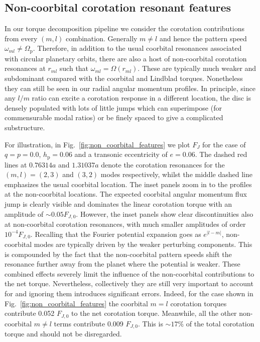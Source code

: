 \subsection{Non-coorbital corotation resonant features}
\label{subsection:non-coorbital resonances}

In our torque decomposition pipeline we consider the corotation contributions from every $(m,l)$ combination. Generally $m \neq l$ and hence the pattern speed $\omega_{ml}\neq \Omega_\textrm{p}$. Therefore, in addition to the usual coorbital resonances associated with circular planetary orbits, there are also a host of non-coorbital corotation resonances at $r_{ml}$ such that $\omega_{ml}=\Omega(r_{ml})$. These are typically much weaker and subdominant compared with the coorbital and Lindblad torques. Nonetheless they can still be seen in our radial angular momentum profiles. In principle, since any $l/m$ ratio can excite a corotation response in a different location, the disc is densely populated with lots of little jumps which can superimpose (for commensurable modal ratios) or be finely spaced to give a complicated substructure.

For illustration, in Fig.~\ref{fig:non_coorbital_features} we plot $F_{J}$ for the case of $q=p=0.0$, $h_\textrm{p}=0.06$ and a transonic eccentricity of $e=0.06$. The dashed red lines at $0.76314 a$ and $1.31037a$ denote the corotation resonances for the $(m,l) = (2,3)$ and $(3,2)$ modes respectively, whilst the middle dashed line emphasizes the usual coorbital location. The inset panels zoom in to the profiles at the non-coorbital locations. The expected coorbital angular momentum flux jump is clearly visible and dominates the linear corotation torque with an amplitude of $\sim 0.05 F_{J,0}$. However, the inset panels show clear discontinuities also at non-coorbital corotation resonances, with much smaller amplitudes of order $10^{-4} F_{J,0}$. Recalling that the Fourier potential expansion goes as $e^{|l-m|}$, non-coorbital modes are typically driven by the weaker perturbing components. This is compounded by the fact that the non-coorbital pattern speeds shift the resonance further away from the planet where the potential is weaker. These combined effects severely limit the influence of the non-coorbital contributions to the net torque. Nevertheless, collectively they are still very important to account for and ignoring them introduces significant errors. Indeed, for the case shown in Fig.~\ref{fig:non_coorbital_features} the coorbital $m=l$ corotation torques contribute 0.052 $F_{J,0}$ to the net corotation torque. Meanwhile, all the other non-coorbital $m \neq l$ terms contribute 0.009 $F_{J,0}$. This is $\sim 17\%$ of the total corotation torque and should not be disregarded.

